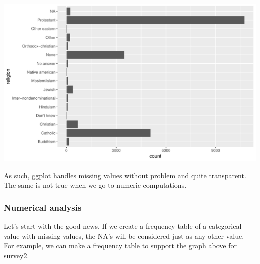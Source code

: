 \documentclass[]{tufte-book}
\newenvironment{Shaded}{}{}
\newcommand{\KeywordTok}[1]{\textcolor[rgb]{0.00,0.44,0.13}{\textbf{#1}}}
\newcommand{\DataTypeTok}[1]{\textcolor[rgb]{0.56,0.13,0.00}{#1}}
\newcommand{\StringTok}[1]{\textcolor[rgb]{0.25,0.44,0.63}{#1}}
\newcommand{\OperatorTok}[1]{\textcolor[rgb]{0.40,0.40,0.40}{#1}}
\newcommand{\NormalTok}[1]{#1}
\begin{document}
\includegraphics{cleaning_tutorial_files/figure-latex/unnamed-chunk-54-1}

As such, ggplot handles missing values without problem and quite
transparent. The same is not true when we go to numeric computations.

\subsubsection{Numerical analysis}\label{numerical-analysis}

Let's start with the good news. If we create a frequency table of a
categorical value with missing values, the NA's will be considered just
as any other value. For example, we can make a frequency table to
support the graph above for survey2.

\begin{Shaded}
\end{Shaded}
\end{document}
